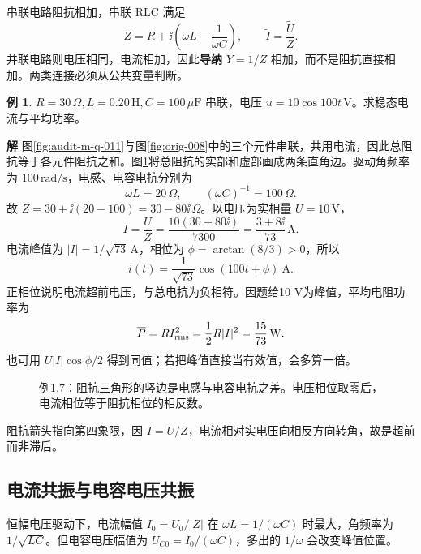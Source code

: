 \documentclass[11pt,openany,fontset=fandol]{ctexbook}
\theoremstyle{plain}\newtheorem{theorem}{定理}[chapter]\newtheorem{proposition}[theorem]{命题}
\theoremstyle{definition}\newtheorem{definition}{定义}[chapter]\newtheorem{example}{例}[chapter]
\theoremstyle{remark}\newtheorem*{remark}{说明}
\newcommand{\SolutionStart}{\par\nobreak\medskip\nobreak\noindent\textbf{解}\quad\ignorespaces}
\newenvironment{solution}{\SolutionStart}{\par\medskip}
\newcommand{\Arg}{\operatorname{Arg}}\newcommand{\rank}{\operatorname{rank}}
\begin{document}
串联电路阻抗相加，串联 RLC 满足
\begin{equation}
Z=R+\ii\left(\omega L-\frac1{\omega C}\right),\qquad \widetilde I=\frac{\widetilde U}{Z}.
\end{equation}
并联电路则电压相同，电流相加，因此\textbf{导纳} $Y=1/Z$ 相加，而不是阻抗直接相加。两类连接必须从公共变量判断。

\begin{example}
$R=30\,\Omega,L=0.20\,\mathrm H,C=100\,\mu\mathrm F$ 串联，电压 $u=10\cos100t\,\mathrm V$。求稳态电流与平均功率。
\end{example}

\begin{solution}
图\ref{fig:audit-m-q-011}与图\ref{fig:orig-008}中的三个元件串联，共用电流，因此总阻抗等于各元件阻抗之和。图\ref{fig:eg-1-7}将总阻抗的实部和虚部画成两条直角边。驱动角频率为 $100\,\mathrm{rad/s}$，电感、电容电抗分别为
\[
\omega L=20\,\Omega,\qquad (\omega C)^{-1}=100\,\Omega.
\]
故 $Z=30+\ii(20-100)=30-80\ii\,\Omega$。以电压为实相量 $U=10\,\mathrm V$，
\[
I=\frac{U}{Z}=\frac{10(30+80\ii)}{7300}
=\frac{3+8\ii}{73}\,\mathrm A.
\]
电流峰值为 $|I|=1/\sqrt{73}\,\mathrm A$，相位为 $\phi=\arctan(8/3)>0$，所以
\[
i(t)=\frac1{\sqrt{73}}\cos(100t+\phi)\ \mathrm A.
\]
正相位说明电流超前电压，与总电抗为负相符。因题给10 V为峰值，平均电阻功率为
\[
\overline P=R I_{\rm rms}^2=\frac12R|I|^2=\frac{15}{73}\,\mathrm W.
\]
也可用 $U|I|\cos\phi/2$ 得到同值；若把峰值直接当有效值，会多算一倍。

\begin{figure}[H]\centering
{}
\caption{例1.7：阻抗三角形的竖边是电感与电容电抗之差。电压相位取零后，电流相位等于阻抗相位的相反数。}\label{fig:eg-1-7}
\end{figure}

阻抗箭头指向第四象限，因 $I=U/Z$，电流相对实电压向相反方向转角，故是超前而非滞后。
\end{solution}

\subsection{电流共振与电容电压共振}
恒幅电压驱动下，电流幅值 $I_0=U_0/|Z|$ 在 $\omega L=1/(\omega C)$ 时最大，角频率为 $1/\sqrt{LC}$。但电容电压幅值为 $U_{C0}=I_0/(\omega C)$，多出的 $1/\omega$ 会改变峰值位置。
\end{document}

